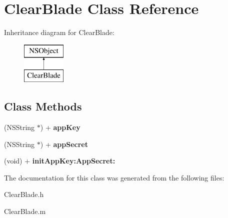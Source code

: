 \hypertarget{interface_clear_blade}{\section{Clear\-Blade Class Reference}
\label{interface_clear_blade}
}
Inheritance diagram for Clear\-Blade\-:\begin{figure}[H]
\begin{center}
\leavevmode
\includegraphics[height=2.000000cm]{interface_clear_blade}
\end{center}
\end{figure}
\subsection*{Class Methods}
\begin{DoxyCompactItemize}
\item 
\hypertarget{interface_clear_blade_aefa5fa46208d7fe4f1ee440aa4a47620}{(N\-S\-String $\ast$) + {\bfseries app\-Key}}\label{interface_clear_blade_aefa5fa46208d7fe4f1ee440aa4a47620}

\item 
\hypertarget{interface_clear_blade_ada3a778e38a9f290b08bc4d0611e7ed2}{(N\-S\-String $\ast$) + {\bfseries app\-Secret}}\label{interface_clear_blade_ada3a778e38a9f290b08bc4d0611e7ed2}

\item 
\hypertarget{interface_clear_blade_a4d5ef33050ded6f2a821f2431d0ade38}{(void) + {\bfseries init\-App\-Key\-:\-App\-Secret\-:}}\label{interface_clear_blade_a4d5ef33050ded6f2a821f2431d0ade38}

\end{DoxyCompactItemize}


The documentation for this class was generated from the following files\-:\begin{DoxyCompactItemize}
\item 
Clear\-Blade.\-h\item 
Clear\-Blade.\-m\end{DoxyCompactItemize}
